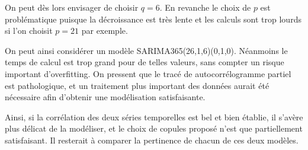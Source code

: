 \documentclass[../report.tex]{subfiles}
\begin{document}
\par On peut dès lors envisager de choisir $q = 6$. En revanche le choix de $p$ est problématique puisque la décroissance est très lente et les calculs sont trop lourds si l’on choisit $p = 21$ par exemple.

\par On peut ainsi considérer un modèle SARIMA365(26,1,6)(0,1,0). Néanmoins le temps de calcul est trop grand pour de telles valeurs, sans compter un risque important d’overfitting. On pressent que le tracé de autocorrélogramme partiel est pathologique, et un traitement plus important des données aurait été nécessaire afin d’obtenir une modélisation satisfaisante.

\par Ainsi, si la corrélation des deux séries temporelles est bel et bien établie, il s'avère plus délicat de la modéliser, et le choix de copules proposé n'est que partiellement satisfaisant. Il resterait à comparer la pertinence de chacun de ces deux modèles.
\end{document}
